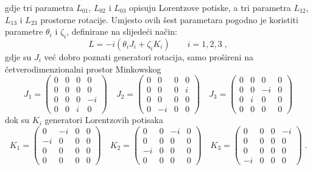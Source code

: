 gdje tri parametra $L_{01}$, $L_{02}$ i $L_{03}$ opisuju Lorentzove
potiske, a tri parametra $L_{12}$, $L_{13}$ i $L_{23}$ prostorne rotacije.
Umjesto ovih šest parametara pogodno je koristiti parametre
$\theta_i$ i $\zeta_i$,  definirane na slijedeći način:
\begin{equation}
 L = -i (\theta_i J_i + \zeta_i K_i)  \qquad i=1,2,3  \;,
\label{eq:LJK}
\end{equation}
gdje su $J_i$ već dobro poznati generatori rotacija, samo prošireni
na četverodimenzionalni prostor Minkowskog
\begin{equation}
 J_1 =
\begin{pmatrix}
0 & 0 & 0 & 0 \\
0 & 0 & 0 & 0 \\
0 & 0 & 0 & -i \\
0 & 0 & i & 0
\end{pmatrix} \quad
 J_2 =
\begin{pmatrix}
0 & 0 & 0 & 0 \\
0 & 0 & 0 & i \\
0 & 0 & 0 & 0 \\
0 & -i & 0 & 0
\end{pmatrix} \quad
J_3 =
\begin{pmatrix}
0 & 0 & 0 & 0 \\
0 & 0 & -i & 0 \\
0 & i & 0 & 0 \\
0 & 0 & 0 & 0
\label{eq:defJi}
\end{pmatrix}
\end{equation}
dok su $K_i$ generatori Lorentzovih potisaka
\begin{equation}
K_1 =
\begin{pmatrix}
0 & -i & 0 & 0 \\
-i & 0 & 0 & 0 \\
0 & 0 & 0 & 0 \\
0 & 0 & 0 & 0
\end{pmatrix} \quad
K_2=
\begin{pmatrix}
0 & 0 & -i & 0 \\
0 & 0 & 0 & 0 \\
-i & 0 & 0 & 0 \\
0 & 0 & 0 & 0
\end{pmatrix} \quad
K_3 =
\begin{pmatrix}
0 & 0 & 0 & -i \\
0 & 0 & 0 & 0 \\
0 & 0 & 0 & 0 \\
-i & 0 & 0 & 0
\end{pmatrix} \;.
\label{eq:defKi}
\end{equation}

